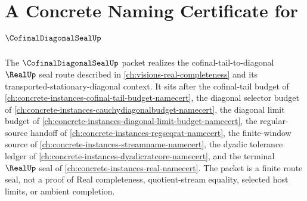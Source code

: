 \chapter{A Concrete Naming Certificate for $\CofinalDiagonalSealUp$}
\label{ch:concrete-instances-cofinal-diagonal-seal-namecert}

The $\CofinalDiagonalSealUp$ packet realizes the cofinal-tail-to-diagonal $\RealUp$ seal route described in \autoref{ch:visions-real-completeness} and its transported-stationary-diagonal context. It sits after the cofinal-tail budget of \autoref{ch:concrete-instances-cofinal-tail-budget-namecert}, the diagonal selector budget of \autoref{ch:concrete-instances-cauchydiagonalbudget-namecert}, the diagonal limit budget of \autoref{ch:concrete-instances-diagonal-limit-budget-namecert}, the regular-source handoff of \autoref{ch:concrete-instances-regseqrat-namecert}, the finite-window source of \autoref{ch:concrete-instances-streamname-namecert}, the dyadic tolerance ledger of \autoref{ch:concrete-instances-dyadicratcore-namecert}, and the terminal $\RealUp$ seal of \autoref{ch:concrete-instances-real-namecert}. The packet is a finite route seal, not a proof of Real completeness, quotient-stream equality, selected host limits, or ambient completion.



